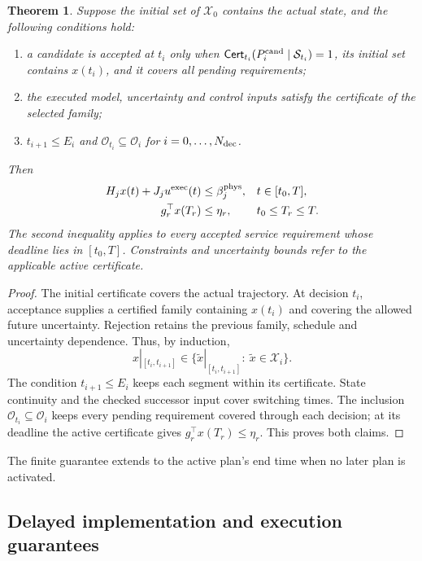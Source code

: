\documentclass[final]{cas-sc}
\theoremstyle{definition}
\theoremstyle{plain}
\newtheorem{theorem}{Theorem}
\theoremstyle{definition}
\theoremstyle{plain}
\begin{document}
\begin{theorem}
\label{thm:new-plan-closure}
Suppose the initial set of $\mathcal X_0$ contains the actual state,
and the following conditions hold:
\begin{enumerate}
\renewcommand{\labelenumi}{(\alph{enumi})}
\item a candidate is accepted at $t_i$ only when
$\mathsf{Cert}_{t_i}(P_i^{\rm cand}\mid\mathcal S_{t_i})=1$, its
initial set contains $x(t_i)$, and it covers all pending requirements;
\item the executed model, uncertainty and control inputs satisfy the
certificate of the selected family;
\item $t_{i+1}\le E_i$ and $\mathcal O_{t_i}\subseteq\mathcal O_i$ for
$i=0,\ldots,N_{\rm dec}$.
\end{enumerate}
Then
\begin{equation}
\begin{aligned}
H_jx(t)+J_ju^{\rm exec}(t)&\le\beta_j^{\rm phys},&& t\in[t_0,T],\\
g_r^\top x(T_r)&\le\eta_r,&& t_0\le T_r\le T.
\end{aligned}
\label{eq:execution-physical-service}
\end{equation}
The second inequality applies to every accepted service requirement
whose deadline lies in $[t_0,T]$. Constraints and uncertainty bounds
refer to the applicable active certificate.
\end{theorem}

\begin{proof}
The initial certificate covers the actual trajectory. At decision
$t_i$, acceptance supplies a certified family containing $x(t_i)$ and
covering the allowed future uncertainty. Rejection retains the previous
family, schedule and uncertainty dependence. Thus, by induction,
\[
x|_{[t_i,t_{i+1}]}\in\{\widetilde x|_{[t_i,t_{i+1}]}:\
\widetilde x\in\mathcal X_i\}.
\]
The condition $t_{i+1}\le E_i$ keeps each segment within its
certificate. State continuity and the checked successor input cover
switching times. The inclusion
$\mathcal O_{t_i}\subseteq\mathcal O_i$ keeps every pending requirement
covered through each decision; at its deadline the active certificate
gives $g_r^\top x(T_r)\le\eta_r$. This proves both claims.
\end{proof}

The finite guarantee extends to the active plan's end time when no
later plan is activated.

\subsection{Delayed implementation and execution guarantees}
\label{sec:planned-handover}
\end{document}
